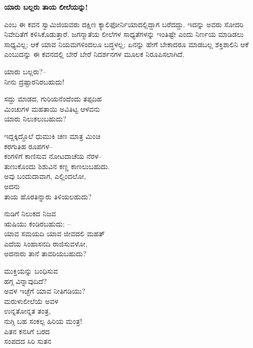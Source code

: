 \selectkan

\begin{center}
\textbf{ಯಾರು ಬಲ್ಲರು ತಾಯ ಲೀಲೆಯನ್ನು!}
\end{center}

 ಎಂಬ ಈ ಕವನ ಸ್ವಾಮಿಜಿಯವರು ದಕ್ಷಿಣ ಕ್ಯಾಲಿಫೋರ್ನಿಯಾದಲ್ಲಿದ್ದಾಗ ಬರೆದದ್ದು. ಇದನ್ನು ಅವರು ಸೋದರಿ ನಿವೇದಿತೆಗೆ ಕಳಿಸಿಕೊಡುತ್ತಾರೆ. ಜಗನ್ಮಾತೆಯ ಲೀಲೆಗಳ ಸಾಧ್ಯತೆಗಳನ್ನು ಇಂತಿಷ್ಟೇ ಎಂದು ನಿರ್ಣಯ ಮಾಡಿಡಲು ಸಾಧ್ಯವಿಲ್ಲ; ಆಕೆ ಯಾವ ನಿಯಮಗಳಿಂದಲೂ ಬದ್ಧಳಲ್ಲ; ಏನನ್ನು ಹೇಗೆ ಬೇಕಾದರೂ ಮಾಡಬಲ್ಲ ಶಕ್ತಿಶಾಲಿನಿ ಆಕೆ ಎಂಬುದನ್ನು ಈ ಕವನದಲ್ಲಿ ಬೇರೆ ಬೇರೆ ನಿದರ್ಶನಗಳ ಮೂಲಕ ನಿರೂಪಿಸಲಾಗಿದೆ.

ಯಾರು ಬಲ್ಲರು?–\\ನೀನು ದ್ರಷ್ಟಾರನಿರಬಹುದು!

\begin{myquote}
ಸದ್ದು ಮಾಡದ, ಗುರಿಯನೆಂದೆಂದು ತಪ್ಪದಿಹ\\ಮಿಂಚುಗಳ ಮಹತಾಯಿ ಅವಿತಿಟ್ಟ ಆಳವನು\\ಯಾರು ನಿಲುಕಲುಬಹುದು?
\end{myquote}

\begin{myquote}
ಇದ್ದಕ್ಕಿದ್ದೊಲೆ ಧುಮುಕಿ ಚಣ ಮಾತ್ರ ಮಿಂಚಿ\\ಕರಗುತಿಹ ರೂಪಗಳ–\\ಕಂಗಳಿಗೆ ಕಾಣಿಸುವ ನೋಟದಾಚೆಯ ನೆರಳ–\\ತುಣುಕೊಂದು ಶಿಶುವಿನ ಕಣ್ಣ ಕಾಣಲುಬಹುದು.\\ಅವು ಬಂದುದಾವಾಗ, ಎಲ್ಲಿಂದಲೋ,\\ಅದನು\\ತಾಯ ಹೊರತಿನ್ನಾರು ತಿಳಿಯಲಹುದು?
\end{myquote}

\begin{myquote}
ನುಡಿಗೆ ನಿಲುಕದ ನಿಜವ\\ಋಷಿಯು ಕಂಡಿರಬಹುದು; –\\ಯಾವ ಸಮಯದಿ ಯಾವ ಜೀವದಲಿ ಮಹತ್\\ಎದೆಯ ಸಿಂಹಾಸನದಿ ರಾಜಿಸುವಳೋ,\\ಅದನಾರು ತಾನೆ ತಾವರಿಯಬಹುದು?
\end{myquote}

\begin{myquote}
ಮುಕ್ತಿಯನ್ನು ಬಂಧಿಸುವ\\ಹಗ್ಗ ವಿನ್ನಾವುದಿದೆ?\\ಅವಳ ಇಚ್ಛೆಗೆ ಯಾವ ನೀತಿಗಡಿಯು?\\ಮರುಳುಲೀಲೆಯೆ ಅವಳ\\ಉನ್ನತೋನ್ನತ ತಂತ್ರ,\\ನುಗ್ಗಿ ಬಹ ಸಂಕಲ್ಪ ಹಿರಿಯ ಮಂತ್ರ!\\ಪಿತನ ಕನಸಿಗೆ ಬರದ\\ಸಂಪದದ ಸಿರಿ ಸುತನ
\end{myquote}

